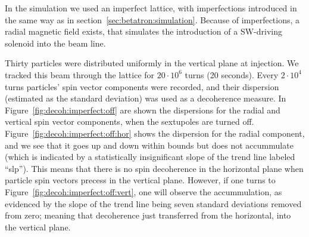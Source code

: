\documentclass[]{elsarticle}
\begin{document}
In the simulation we used an imperfect lattice, with imperfections introduced in the same way as
in section~\ref{sec:betatron:simulation}. Because of imperfections, a radial magnetic field exists, that
simulates the introduction of a SW-driving solenoid into the beam line.

Thirty particles were distributed uniformly in the vertical plane at injection. We tracked this beam through
the lattice for $20\cdot 10^6$ turns (20 seconds). Every $2\cdot10^4$ turns particles'
spin vector components were recorded, and their dispersion (estimated as the standard deviation) was used
as a decoherence measure. In Figure~\ref{fig:decoh:imperfect:off} are shown the dispersions for the
radial and vertical spin vector components, when the sextupoles are turned off.
Figure~\ref{fig:decoh:imperfect:off:hor} shows the dispersion for the radial component, and we see that it
goes up and down within bounds but does not accummulate (which is indicated by
a statistically insignificant slope of the trend line labeled ``slp'').
This means that there is no spin decoherence in the horizontal plane when particle spin vectors precess
in the vertical plane. However, if one turns to Figure~\ref{fig:decoh:imperfect:off:vert}, one will
observe the accummulation, as evidenced by the slope of the trend line being
seven standard deviations removed from zero; meaning that decoherence just transferred from the horizontal,
into the vertical plane.
\end{document}
